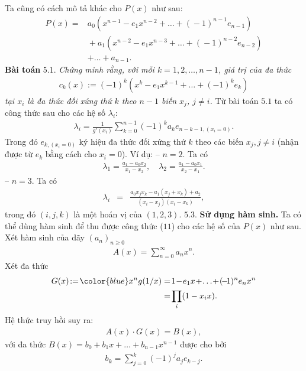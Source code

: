 \begin{multicols}{2}
	Ta cũng có cách mô tả khác cho $P(x)$ như sau:
	\begin{align*}
		P(x)=&a_0(x^{n\!-\!1}\!-\!e_1x^{n\!-\!2}\!+\!\ldots\!+\!(\!-\!1)^{n\!-\!1}e_{n\!-\!1})\\
		&\!+\!a_1(x^{n\!-\!2}\!-\!e_1x^{n\!-\!3}\!+\!\ldots\!+\!(\!-\!1)^{n\!-\!2}e_{n\!-\!2})\\
		&+
		\ldots+a_{n-1}.
	\end{align*}
	\textbf{\color{hoccungpi}Bài toán} $\pmb{5.1.}$ \textit{Chứng minh rằng, với mỗi $k=1,2,\ldots,n-1$, giá trị của đa thức
	\begin{align*}
		c_k(x):=(-1)^k(x^k-e_1x^{k-1}+\ldots+(-1)^ke_k)
	\end{align*}
	tại $x_i$ là đa thức đối xứng thứ $k$ theo $n-1$ biến $x_j$,  $j\neq i$.}
	\vskip 0.1cm	
	Từ bài toán $5.1$ ta có công thức sau cho các hệ số $\lambda_i$:
	\begin{align*}
		\lambda_i=\frac{1}{g'(x_i)}\sum_{k=0}^{n-1}(-1)^ka_ke_{n-k-1, (x_i=0)}.
	\end{align*}
	Trong đó $e_{k,(x_i=0)}$ ký hiệu đa thức đối xứng thứ $k$ theo các biến $x_j,j\neq i$ (nhận được từ $e_k$ bằng cách cho $x_i=0$). Ví dụ:
	\vskip 0.1cm
	-- $n=2$. Ta có 
	\begin{align*}
		\lambda_1= \frac{a_1-a_0x_2}{x_1-x_2},\quad 
		\lambda_2=\frac{a_1-a_0x_1}{x_2-x_1}.
	\end{align*}
	-- $n=3$. Ta có
	\begin{align*}
		\lambda_i&=&\frac{a_0x_jx_k-a_1(x_j+x_k)+a_2}{(x_i-x_j)(x_i-x_k)}, 
	\end{align*}
	trong đó $(i,j,k)$ là một hoán vị của $(1,2,3)$.	
	\vskip 0.1cm
	$\pmb{5.3.}$ \textbf{\color{hoccungpi}Sử dụng hàm sinh.}  
	Ta có thể dùng hàm sinh để thu được công thức ($11$) cho các hệ số của $P(x)$  như sau.
	Xét hàm sinh của dãy $(a_n)_{n\geq 0}$
	\begin{align*}
		A(x)=\sum_{n=0}^\infty a_n x^n.
	\end{align*}
	Xét đa thức
	\begin{align*}
		G(x)\!:=\!{\color{blue} x^ng(1/x)}&=\!1\!-\!e_1x\!+\!\ldots\!+\!(\!-\!1)^n e_n x^n\\
		&=\!\prod_i(1-x_i x).
	\end{align*}
	Hệ thức truy hồi suy ra:
	\begin{align*}
		A(x)\cdot G(x)=B(x),
	\end{align*}
	với đa thức $B(x)=b_0+b_1x+\ldots+b_{n-1}x^{n-1}$ được cho bởi
	\begin{align*}
		b_k=\sum_{j=0}^k (-1)^j a_{j}e_{k-j}.

\end{align*}
\end{multicols}

